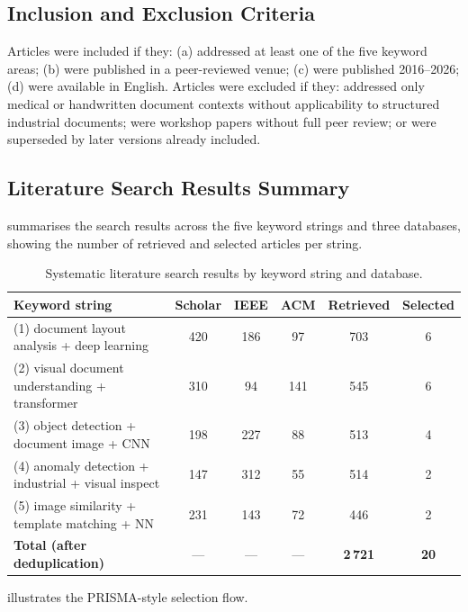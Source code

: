 \subsection{Inclusion and Exclusion Criteria}

Articles were included if they: (a) addressed at least one of the five keyword areas;
(b) were published in a peer-reviewed venue; (c) were published 2016–2026;
(d) were available in English. Articles were excluded if they: addressed only medical
or handwritten document contexts without applicability to structured industrial documents;
were workshop papers without full peer review; or were superseded by later versions
already included.

\subsection{Literature Search Results Summary}

 summarises the search results across the five keyword strings
and three databases, showing the number of retrieved and selected articles per string.

\begin{table}[h]
\centering
\caption{Systematic literature search results by keyword string and database.}
\label{tab:lit_search}
\begin{tabular}{p{6.5cm}ccccc}
\toprule
\textbf{Keyword string} & \textbf{Scholar} & \textbf{IEEE} & \textbf{ACM} & \textbf{Retrieved} & \textbf{Selected} \\
\midrule
(1) document layout analysis + deep learning        & 420 & 186 & 97  & 703 & 6 \\
(2) visual document understanding + transformer     & 310 & 94  & 141 & 545 & 6 \\
(3) object detection + document image + CNN         & 198 & 227 & 88  & 513 & 4 \\
(4) anomaly detection + industrial + visual inspect & 147 & 312 & 55  & 514 & 2 \\
(5) image similarity + template matching + NN       & 231 & 143 & 72  & 446 & 2 \\
\midrule
\textbf{Total (after deduplication)}                & --- & --- & --- & \textbf{2\,721} & \textbf{20} \\
\bottomrule
\end{tabular}
\end{table}

 illustrates the PRISMA-style selection flow.

